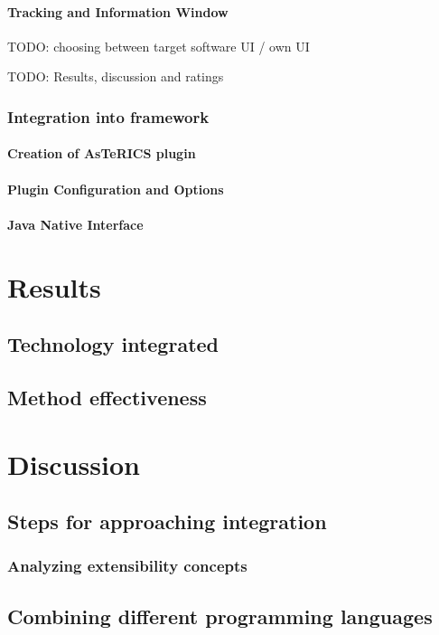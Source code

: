 \documentclass[BSA,Bachelor,english]{twbook}%
\begin{document}
\subsubsection{Tracking and Information Window}

TODO: choosing between target software UI / own UI

TODO: Results, discussion and ratings

\subsection{Integration into framework}
\subsubsection{Creation of AsTeRICS plugin}
\subsubsection{Plugin Configuration and Options}
\subsubsection{Java Native Interface}


\chapter{Results}
\section{Technology integrated}
\section{Method effectiveness}

\chapter{Discussion}
\section{Steps for approaching integration}
\subsection{Analyzing extensibility concepts}
\section{Combining different programming languages}
\end{document}
